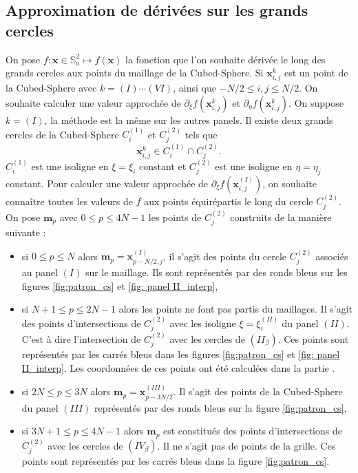 \subsection{Approximation de dérivées sur les grands cercles}

On pose $f : \mathbf{x}\in \mathbb{S}_a^2 \mapsto f(\mathbf{x})$ la fonction que l'on souhaite dérivée le long des grands cercles aux points du maillage de la Cubed-Sphere.
Si $\mathbf{x}_{i,j}^k$ est un point de la Cubed-Sphere avec $k = (I) \cdots (VI)$, ainsi que $-N/2 \leq i,j \leq N/2$. On souhaite calculer une valeur approchée de 
$
\partial_{\xi} f (\mathbf{x}_{i,j}^k)$ et $\partial_{\eta} f (\mathbf{x}_{i,j}^k)$.
On suppose $k = (I)$, la méthode est la même sur les autres panels. Il existe deux grands cercles de la Cubed-Sphere $C_i^{(1)}$ et $C_j^{(2)}$ tels que 
\begin{equation}
\mathbf{x}_{i,j}^k \in C_i^{(1)} \cap C^{(2)}_j.
\end{equation}
$C^{(1)}_i$ est une isoligne en $\xi = \xi_i$ constant et $C^{(2)}_j$ est une isoligne en $\eta = \eta_j$ constant.
Pour calculer une valeur approchée de $\partial_{\xi} f (\mathbf{x}_{i,j}^{(I)})$, on souhaite connaître toutes les valeurs de $f$ aux points équirépartis le long du cercle $C^{(2)}_j$. On pose $\mathbf{m}_p$ avec $0 \leq p \leq 4N-1$ les points de $C^{(2)}_j$ construits de la manière suivante :
\begin{itemize}
\item si $0 \leq p \leq N$ alors $\mathbf{m}_p = \mathbf{x}^{(I)}_{p-N/2,j}$, il s'agit des points du cercle $C^{(2)}_j$ associés au panel $(I)$ sur le maillage. Ils sont représentés par des ronds bleus sur les figures \ref{fig:patron_cs} et \ref{fig: panel II_interp},
\item si $N+1 \leq p \leq 2N-1$ alors les points ne font pas partis du maillages. Il s'agit des points d'intersections de $C^{(2)}_j$ avec les isoligne $\xi = \xi_i^{(II)}$ du panel $(II)$. C'est à dire l'intersection de $C^{(2)}_j$ avec les cercles de $(II_{\beta})$. Ces points sont représentés par les carrés bleus dans les figures \ref{fig:patron_cs} et \ref{fig: panel II_interp}. Les coordonnées de ces points ont été calculées dans la partie \REF.
\item si $2N \leq p \leq 3N$ alors $\mathbf{m}_p = \mathbf{x}^{(III)}_{p-3N/2}$. Il s'agit des points de la Cubed-Sphere du panel $(III)$ représentés par des ronds bleus sur la figure \ref{fig:patron_cs},
\item si $3N+1 \leq p \leq 4N-1$ alors $\mathbf{m}_p$ est constitués des points d'intersections de $C^{(2)}_j$ avec les cercles de $(IV_{\beta})$. Il ne s'agit pas de points de la grille. Ces points sont représentés par les carrés bleus dans la figure \ref{fig:patron_cs}.
\end{itemize}

